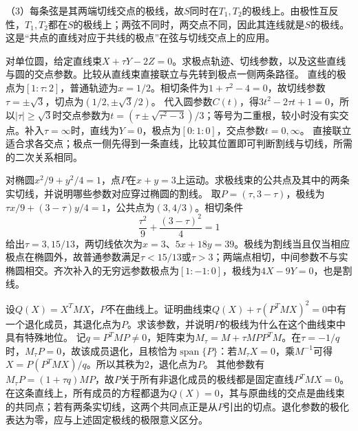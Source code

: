 （3）每条弦是其两端切线交点的极线，故\(S\)同时在\(T_1,T_2\)的极线上。由极性互反性，\(T_1,T_2\)都在\(S\)的极线上；两弦不同时，两交点不同，因此其连线就是\(S\)的极线。这是“共点的直线对应于共线的极点”在弦与切线交点上的应用。


对单位圆，给定直线束\(X+\tau Y-2Z=0\)。求极点轨迹、切线参数，以及这些直线与圆的交点参数。比较从直线束直接联立与先转到极点一侧两条路径。
\solutionanswer
直线的极点为\([1:\tau:2]\)，普通轨迹为\(x=1/2\)。相切条件为\(1+\tau^2-4=0\)，故切线参数\(\tau=\pm\sqrt3\)，切点为\((1/2,\pm\sqrt3/2)\)。
代入圆参数\(C(t)\)，得\(3t^2-2\tau t+1=0\)，所以\(|\tau|\ge\sqrt3\)时交点参数为\(t=(\tau\pm\sqrt{\tau^2-3})/3\)；等号为二重根，较小时没有实交点。补入\(\tau=\infty\)时，直线为\(Y=0\)，极点为\([0:1:0]\)，交点参数\(t=0,\infty\)。
直接联立适合求各交点；极点一侧先得到一条直线，比较其位置即可判断割线与切线，所需的二次关系相同。


对椭圆\(x^2/9+y^2/4=1\)，点\(P\)在\(x+y=3\)上运动。求极线束的公共点及其中的两条实切线，并说明哪些参数对应穿过椭圆的割线。
\solutionanswer
取\(P=(\tau,3-\tau)\)，极线为\(\tau x/9+(3-\tau)y/4=1\)，公共点为\((3,4/3)\)。相切条件
\[
 \frac{\tau^2}{9}+\frac{(3-\tau)^2}{4}=1
\]
给出\(\tau=3,15/13\)，两切线依次为\(x=3\)、\(5x+18y=39\)。极线为割线当且仅当相应极点在椭圆外，故普通参数满足\(\tau<15/13\)或\(\tau>3\)；两端点相切，中间参数不与实椭圆相交。齐次补入的无穷远参数极点为\([1:-1:0]\)，极线为\(4X-9Y=0\)，也是割线。


设\(Q(X)=X^TMX\)，\(P\)不在曲线上。证明曲线束\(Q(X)+\tau(P^TMX)^2=0\)中有一个退化成员，其退化点为\(P\)。求该参数，并说明\(P\)的极线为什么在这个曲线束中具有特殊地位。
\solutionanswer
记\(q=P^TMP\ne0\)，矩阵束为\(M_\tau=M+\tau MPP^TM\)。在\(\tau=-1/q\)时，\(M_\tau P=0\)，故该成员退化，且核恰为\(\operatorname{span}\{P\}\)：若\(M_\tau X=0\)，乘\(M^{-1}\)可得\(X=P(P^TMX)/q\)。所以其秩为\(2\)，退化点为\(P\)。
其他参数有\(M_\tau P=(1+\tau q)MP\)，故\(P\)关于所有非退化成员的极线都是固定直线\(P^TMX=0\)。在这条直线上，所有成员的方程都退为\(Q(X)=0\)，其与原曲线的交点是曲线束的共同点；若有两条实切线，这两个共同点正是从\(P\)引出的切点。退化参数的极化表达为零，应与上述固定极线的极限意义区分。


